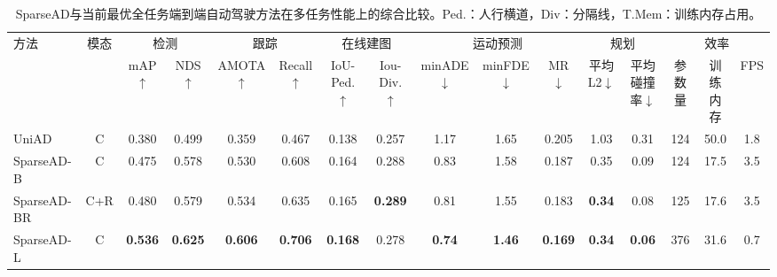 \begin{table}[t]
	\caption{SparseAD与当前最优全任务端到端自动驾驶方法在多任务性能上的综合比较。Ped.：人行横道，Div：分隔线，T.Mem：训练内存占用。}
	\begin{center}
	\tiny
	\vspace{-10pt}
	\resizebox{1\textwidth}{!}
	{
	\begin{tabular}{l|c|cc|cc|cc|ccc|cc|ccc}
	\toprule
	\multirow{2}{*}{方法} &
	\multirow{2}{*}{模态} &
	\multicolumn{2}{c|}{检测} &
	\multicolumn{2}{c|}{跟踪} &
	\multicolumn{2}{c|}{在线建图} &
	\multicolumn{3}{c|}{运动预测} &
	\multicolumn{2}{c}{规划 } &
	\multicolumn{3}{c}{效率} \\
	&& mAP$\uparrow$ & NDS$\uparrow$ & AMOTA$\uparrow$&Recall$\uparrow$ &IoU-Ped.$\uparrow$ & Iou-Div.$\uparrow$& minADE$\downarrow$&minFDE$\downarrow$&MR$\downarrow$ &平均L2$\downarrow$ &平均碰撞率$\downarrow$ & 参数量 & 训练内存 & FPS\\
	\midrule
	UniAD\cite{hu2023planning}&C&0.380& 0.499& 0.359& 0.467&0.138&0.257&1.17& 1.65& 0.205& 1.03 &0.31&124&50.0&1.8\\
	\midrule
	SparseAD-B&C& 0.475& 0.578& 0.530& 0.608 &0.164&0.288& 0.83& 1.58& 0.187& 0.35& 0.09&124&17.5&3.5\\
	SparseAD-BR&C+R&0.480& 0.579 & 0.534 &0.635&0.165&\textbf{0.289}&0.81& 1.55 &0.183 &\textbf{0.34}& 0.08&125&17.6&3.5\\
	SparseAD-L&C&\textbf{0.536}& \textbf{0.625} & \textbf{0.606}& \textbf{0.706}&\textbf{0.168}&0.278&\textbf{0.74}& \textbf{1.46}& \textbf{0.169}& \textbf{0.34}& \textbf{0.06}&376&31.6&0.7\\
	\bottomrule
	\end{tabular}%
	}
	\end{center}
	\label{tab:joint-results}
	\end{table}